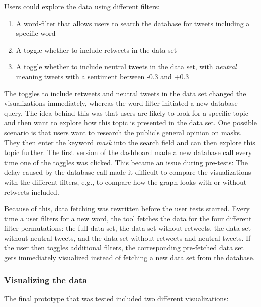 Users could explore the data using different filters:
\begin{enumerate}
    \item A word-filter that allows users to search the database for tweets including a specific word
    \item A toggle whether to include retweets in the data set
    \item A toggle whether to include neutral tweets in the data set, with \emph{neutral} meaning tweets with a sentiment between -0.3 and +0.3 %
\end{enumerate}

The toggles to include retweets and neutral tweets in the data set changed the visualizations immediately, whereas the word-filter initiated a new database query. The idea behind this was that users are likely to look for a specific topic and then want to explore how this topic is presented in the data set. One possible scenario is that users want to research the public's general opinion on masks. They then enter the keyword \emph{mask} into the search field and can then explore this topic further. The first version of the dashboard made a new database call every time one of the toggles was clicked. This became an issue during pre-tests: The delay caused by the database call made it difficult to compare the visualizations with the different filters, e.g., to compare how the graph looks with or without retweets included.

Because of this, data fetching was rewritten before the user tests started. Every time a user filters for a new word, the tool fetches the data for the four different filter permutations: the full data set, the data set without retweets, the data set without neutral tweets, and the data set without retweets and neutral tweets. If the user then toggles additional filters, the corresponding pre-fetched data set gets immediately visualized instead of fetching a new data set from the database.

\subsubsection{Visualizing the data}
The final prototype that was tested included two different visualizations:

